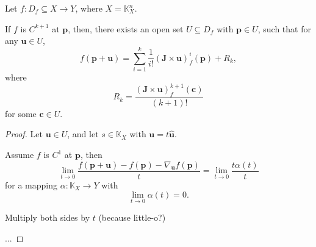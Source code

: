 \documentclass{article}
\begin{document}
\begin{proposition}
	\label{prop: taylor's theorem}
	Let $f: D_f \subseteq X \to Y$, where $X = \mathbb K_X^n$.
	
	If $f$ is $C^{k + 1}$ at $\mathbf p$, then, there exists an open set $U \subseteq D_f$ with $\mathbf p \in U$, such that for any $\mathbf u \in U$,
	$$
	f(\mathbf p + \mathbf u) = \sum_{i = 1}^k \frac{1}{i!} (\mathbf J \times \mathbf u)_f^i (\mathbf p) + R_k,
	$$
	where
	$$
	R_k = \frac{(\mathbf J \times \mathbf u)_f^{k + 1}(\mathbf c)}{(k + 1)!}
	$$
	for some $\mathbf c \in U$.
	
	\begin{proof}
		Let $\mathbf u \in U$, and let $s \in \mathbb K_X$ with $\mathbf u = t \mathbf{\hat u}$.
	
		Assume $f$ is $C^{1}$ at $\mathbf p$, then
		\begin{equation}
			\tag{1}
			\lim_{t \to 0} \frac{f(\mathbf p + \mathbf u) - f(\mathbf p) - \nabla_{\mathbf u}f(\mathbf p)}{t} = \lim_{t \to 0} \frac{t \alpha (t)}{t}
		\end{equation}
		for a mapping $\alpha: \mathbb K_X \to Y$ with
		$$
		\lim_{t \to 0} \alpha (t) = 0.
		$$
		
		Multiply both sides by $t$ (because little-o?)
		
		...
	\end{proof}
\end{proposition}






















\end{document}

